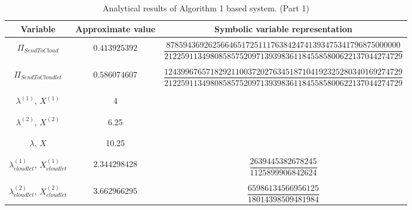 \documentclass[10pt,a4paper]{article}
\begin{document}
\begin{table}[h!]
\caption{Analytical results of Algorithm 1 based system. (Part 1)}
\begin{adjustbox}{center=\textwidth}
	
     \begin{tabular}{c|c|c}
     \toprule
     \textbf{Variable} & \textbf{Approximate value} & \textbf{Symbolic variable representation} \\
     \toprule
	 &&\\
	 $\Pi_{SendToCloud}$ & $0.413925392$ & $\dfrac{87859436926256646517251117638424741393475341796875000000}{212259113498085857520971393983611845585800622137044274729}$  \\
	 
	 &&\\\hline &&\\
	 
	 $\Pi_{SendToCloudlet}$ & $0.586074607$ &  $\dfrac{124399676571829211003720276345187104192325280340169274729}{212259113498085857520971393983611845585800622137044274729}$  \\
	 
     &&\\\hline &&\\

	 $\lambda^{(1)}$, $X^{(1)}$ & 4 & \\
	 
	 &&\\\hline &&\\

	 $\lambda^{(2)}$, $X^{(2)}$ & 6.25 & \\
	 
	 &&\\\hline &&\\

	 $\lambda$, $X$ & 10.25 & \\
	 
	 &&\\\hline &&\\

     $\lambda_{cloudlet}^{(1)}$, $X_{cloudlet}^{(1)}$ & $2.344298428$ & $\dfrac{2639445382678245}{1125899906842624}$ \\

	 &&\\\hline &&\\

     $\lambda_{cloudlet}^{(2)}$, $X_{cloudlet}^{(2)}$ & $3.662966295$ & $\dfrac{65986134566956125}{18014398509481984}$ \\


\end{tabular}
\end{adjustbox}
\end{table}
\end{document}
